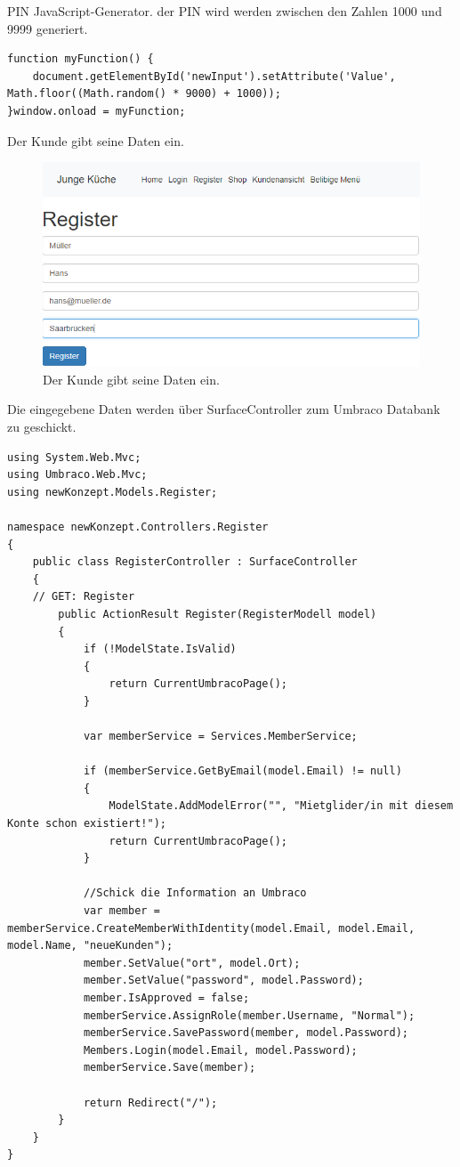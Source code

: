 PIN JavaScript-Generator. der PIN wird werden zwischen den Zahlen 1000 und 9999 generiert.

\begin{lstlisting}[caption={PIN-Generator}, label=lst:PIN-Generator]
function myFunction() {
	document.getElementById('newInput').setAttribute('Value', Math.floor((Math.random() * 9000) + 1000));
}window.onload = myFunction;

\end{lstlisting}
Der Kunde gibt seine Daten ein.

\begin{figure}[h]
	\centering
	\includegraphics[width=1\linewidth]{Graphics/newRegister.png}
	\caption[newRegister]{Der Kunde gibt seine Daten ein.}
	\label{fig: newRegister}
\end{figure}

Die eingegebene Daten werden über SurfaceController zum Umbraco Databank zu geschickt.


\begin{lstlisting}[caption={RegisterConsontroller}, label=lst:RegisterConsontroller]
using System.Web.Mvc;
using Umbraco.Web.Mvc;
using newKonzept.Models.Register;

namespace newKonzept.Controllers.Register
{
	public class RegisterController : SurfaceController
	{
	// GET: Register
		public ActionResult Register(RegisterModell model)
		{
			if (!ModelState.IsValid)
			{
				return CurrentUmbracoPage();
			}

			var memberService = Services.MemberService;

			if (memberService.GetByEmail(model.Email) != null)
			{
				ModelState.AddModelError("", "Mietglider/in mit diesem Konte schon existiert!");
				return CurrentUmbracoPage();
			}

			//Schick die Information an Umbraco
			var member = memberService.CreateMemberWithIdentity(model.Email, model.Email, model.Name, "neueKunden");
			member.SetValue("ort", model.Ort);
			member.SetValue("password", model.Password);
			member.IsApproved = false;
			memberService.AssignRole(member.Username, "Normal");
			memberService.SavePassword(member, model.Password);
			Members.Login(model.Email, model.Password);
			memberService.Save(member);

			return Redirect("/");
		}
	}
}
\end{lstlisting}

